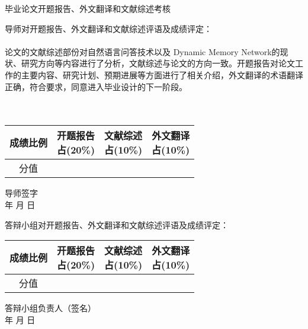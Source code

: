 \thispagestyle{empty}
{
\begin{center}
\stfangsong\sihao 毕业论文开题报告、外文翻译和文献综述考核
\end{center}
}
{\songti\sihao 导师对开题报告、外文翻译和文献综述评语及成绩评定：}
\\
\\  论文的文献综述部份对自然语言问答技术以及 Dynamic Memory Network的现状、研究方向等内容进行了分析，文献综述与论文的方向一致。开题报告对论文工作的主要内容、研究计划、预期进展等方面进行了相关介绍，外文翻译的术语翻译正确，符合要求，同意进入毕业设计的下一阶段。\\
\\
\\

{
\hspace{3cm} \songti\xiaosi
\begin{tabular}{|c|c|c|c|}
    \hline
    成绩比例 & \parbox[t]{4em}{开题报告\\[-1.5em]占(20\%)} &
               \parbox[t]{4em}{文献综述\\[-1.5em]占(10\%)} &
               \parbox[t]{4em}{外文翻译\\[-1.5em]占(10\%)} \\

    \hline
    分值   & & &  \\
    \hline
\end{tabular}
}
\begin{flushright}
    导师签字\;\underline{\hspace{4em}}\\
    年 \quad 月 \quad 日
\end{flushright}

{\songti\sihao 答辩小组对开题报告、外文翻译和文献综述评语及成绩评定：}
\vspace{4cm}

{
\hspace{3cm} \songti\xiaosi
\begin{tabular}{|c|c|c|c|}
    \hline
    成绩比例 & \parbox[t]{4em}{开题报告\\[-1.5em]占(20\%)} &
               \parbox[t]{4em}{文献综述\\[-1.5em]占(10\%)} &
               \parbox[t]{4em}{外文翻译\\[-1.5em]占(10\%)} \\

    \hline
    分值   & & &  \\
    \hline
\end{tabular}
}
\begin{flushright}
    答辩小组负责人（签名）\;\underline{\hspace{4em}}\\
    年 \quad 月 \quad 日
\end{flushright}

